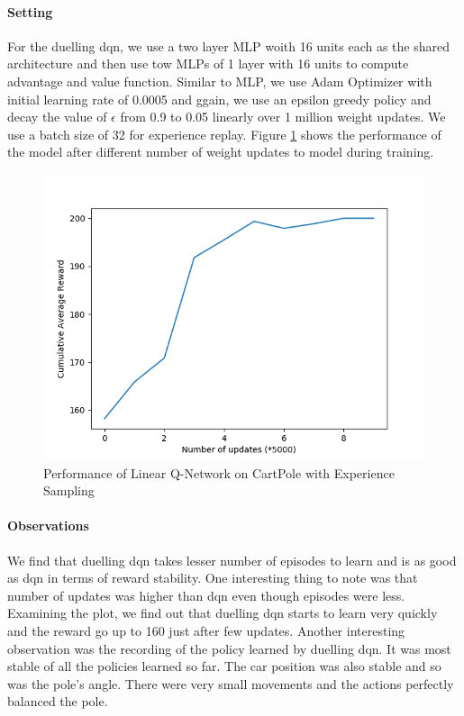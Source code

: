 \documentclass[12pt]{article}
\begin{document}
\paragraph{Setting} For the duelling dqn, we use a two layer MLP woith 16 units each as the shared architecture and then use tow MLPs of 1 layer with 16 units to compute advantage and value function. Similar to MLP, we use Adam Optimizer with initial learning rate of 0.0005 and ggain, we use an epsilon greedy policy and decay the value of $\epsilon$ from 0.9 to 0.05 linearly over 1 million weight updates. We use a batch size of 32 for experience replay. Figure \ref{fig:05} shows the performance of the model after different number of weight updates to model during training.
\begin{figure}[h]
  \centering
  \vspace{-5mm}
  \includegraphics[width=0.8\linewidth]{figures/reward_plot_05.png}
  \caption{Performance of Linear Q-Network on CartPole with Experience Sampling}
  \label{fig:05}
\end{figure}
\paragraph{Observations} We find that duelling dqn takes lesser number of episodes to learn and is as good as dqn in terms of reward stability. One interesting thing to note was that number of updates was higher than dqn even though episodes were less. Examining the plot, we find out that duelling dqn starts to learn very quickly and the reward go up to 160 just after few updates. Another interesting observation was the recording of the policy learned by duelling dqn. It was most stable of all the policies learned so far. The car position was also stable and so was the pole's angle. There were very small movements and the actions perfectly balanced the pole. 
\end{document}
